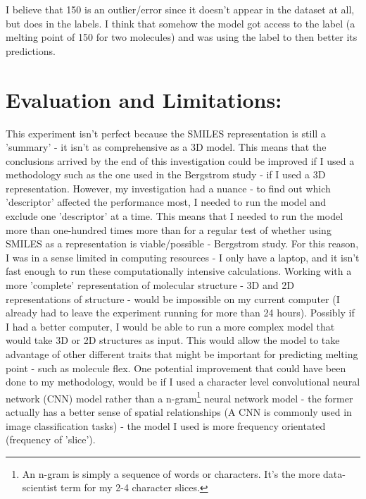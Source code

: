 \documentclass[11pt]{article}
\begin{document}
I believe that 150 is an outlier/error since it doesn't appear in the dataset at all, but does in the labels. I think that somehow the model got access to the label (a melting point of 150 for two molecules) and was using the label to then better
its predictions. 

\section{Evaluation and Limitations:}
\label{sec:org464e74f}
This experiment isn't perfect because the SMILES representation is still a 'summary' - it isn't as comprehensive as a 3D model. This means that
the conclusions arrived by the end of this investigation could be improved if I used a methodology such as the 
one used in the Bergstrom study - if I used a 3D representation. However, my investigation
had a nuance - to find out which 'descriptor' affected the performance most, I needed to run the model 
and exclude one 'descriptor' at a time. This means that I needed to run the model more than one-hundred times more than
for a regular test of whether using SMILES as a representation is viable/possible - Bergstrom study. For this reason, I was in a sense limited in computing resources -
I only have a laptop, and it isn't fast enough to run these computationally intensive calculations. Working with a more 'complete' representation
of molecular structure - 3D and 2D representations of structure - would be impossible on my current computer (I already had to leave the experiment
running for more than 24 hours). Possibly if I had a better computer, I would be able to run a more complex model that would take 3D or 2D 
structures as input. This would allow the model to take advantage of other different traits that might be important for predicting
melting point - such as molecule flex. One potential improvement that could have
been done to my methodology, would be if I used a character level convolutional neural network (CNN) model rather than a n-gram\footnote{An n-gram is simply a sequence of words or characters. It's the more data-scientist term for my 2-4 character slices.} neural network model - the former
actually has a better sense of spatial relationships \cite{zhang2015character} (A CNN is commonly used in image classification tasks) - the model I used is more frequency orientated (frequency of 'slice').
\end{document}
